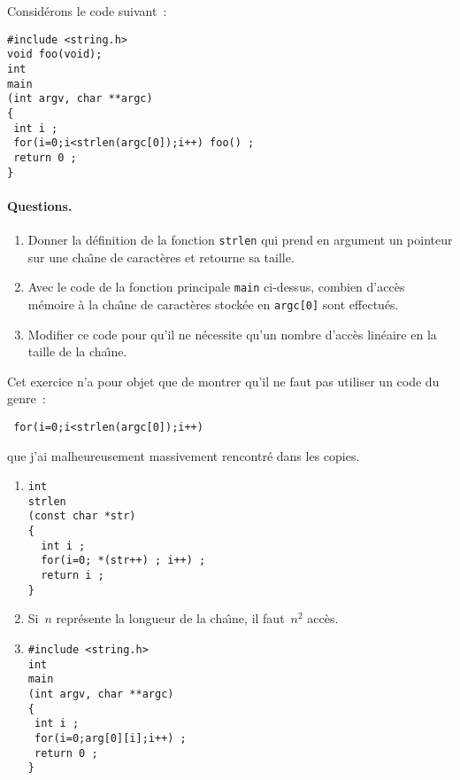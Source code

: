Consid\'erons le code suivant~:
\begin{verbatim}
#include <string.h>
void foo(void);
int
main
(int argv, char **argc)
{
 int i ;
 for(i=0;i<strlen(argc[0]);i++) foo() ;
 return 0 ;
}
\end{verbatim}
\paragraph{Questions.}
\begin{enumerate}
\item Donner la d\'efinition de la fonction \verb+strlen+ qui prend en
  argument un pointeur sur une cha\^\i{}ne de caract\`eres et retourne
  sa taille.
\item Avec le code de la fonction principale \verb+main+ ci-dessus,
  combien d'acc\`es m\'emoire \`a la cha\^\i{}ne de caract\`eres
  stock\'ee en \verb+argc[0]+ sont effectu\'es.
\item Modifier ce code pour qu'il ne n\'ecessite qu'un nombre
  d'acc\`es lin\'eaire en la taille de la cha\^\i{}ne.
\end{enumerate}
\ifcorrection%
\begin{correction}
  Cet exercice n'a pour objet que de montrer qu'il ne faut pas utiliser un code du genre~:
\begin{verbatim}
 for(i=0;i<strlen(argc[0]);i++) 
\end{verbatim}
  que j'ai malheureusement massivement rencontr\'e dans les copies.
  \begin{enumerate}
  \item 
\begin{verbatim}
int
strlen
(const char *str)
{
  int i ;
  for(i=0; *(str++) ; i++) ;
  return i ;
}
\end{verbatim}

  \item Si~$n$ repr\'esente la longueur de la cha\^\i{}ne, il
    faut~$n^{2}$ acc\`es.
  \item 
\begin{verbatim}
#include <string.h>
int
main
(int argv, char **argc)
{
 int i ;
 for(i=0;arg[0][i];i++) ;
 return 0 ;
}
\end{verbatim}

  \end{enumerate}
\end{correction}
\fi%
